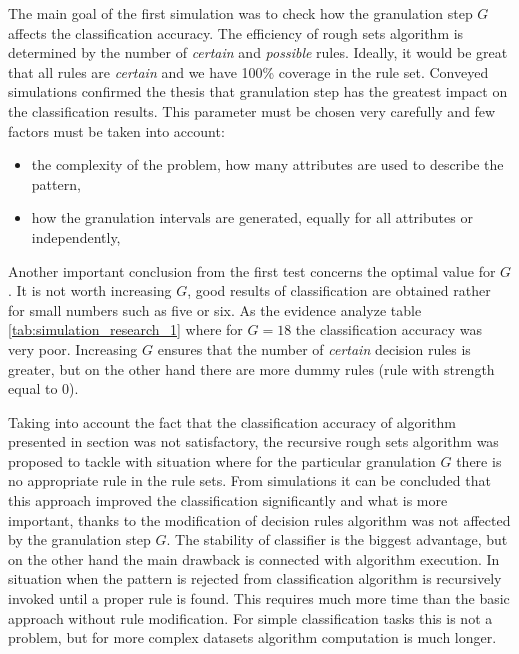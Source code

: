The main goal of the first simulation was to check how the granulation step $G$
affects the classification accuracy. The efficiency of rough sets algorithm is
determined by the number of \textit{certain} and \textit{possible} rules. Ideally, it would be
great that all rules are \textit{certain} and we have 100\% coverage in the rule set.
Conveyed simulations confirmed the thesis that granulation step has the
greatest impact on the classification results. This parameter must be chosen
very carefully and few factors must be taken into account:
\begin{itemize}
    \item the complexity of the problem, how many attributes are used to
        describe the pattern,
    \item how the granulation intervals are generated, equally for all
        attributes or independently,
\end{itemize}
Another important conclusion from the first test concerns the optimal value for
$G$. It is not worth increasing $G$, good results of classification are
obtained rather for small numbers such as five or six. As the evidence analyze
table \ref{tab:simulation_research_1} where for $G=18$ the classification accuracy
was very poor. Increasing $G$ ensures that the number of \textit{certain} decision rules
is greater, but on the other hand there are more dummy rules (rule with
strength equal to 0). 

Taking into account the fact that the classification accuracy of algorithm
presented in section \label{cha:Simulation_reaearch_1} was not satisfactory,
the recursive rough sets algorithm was proposed to tackle with situation where
for the particular granulation $G$ there is no appropriate rule in the rule sets. From
simulations it can be concluded that this approach improved the classification
significantly and what is more important, thanks to the modification of
decision rules algorithm was not affected by the granulation step $G$. The stability
of classifier is the biggest advantage, but on the other hand the main drawback
is connected with algorithm execution. In situation when the pattern is rejected
from classification algorithm is recursively invoked until a proper rule is
found. This requires much more time than the basic approach without rule
modification.  For simple classification tasks this is not a problem, but for
more complex datasets algorithm computation is much longer.

